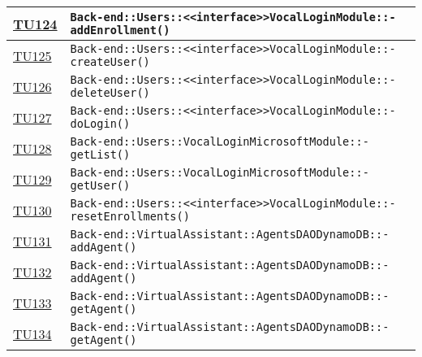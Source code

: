 \begin{longtable}{|>{\centering}m{1cm}|m{12cm}<{\centering}|}
\hyperlink{TU124}{TU124} & \texttt{Back-end::Users::<<interface>>VocalLoginModule::-\linebreak addEnrollment()}\\ \hline

\hyperlink{TU125}{TU125} & \texttt{Back-end::Users::<<interface>>VocalLoginModule::-\linebreak createUser()}\\ \hline

\hyperlink{TU126}{TU126} & \texttt{Back-end::Users::<<interface>>VocalLoginModule::-\linebreak deleteUser()}\\ \hline

\hyperlink{TU127}{TU127} & \texttt{Back-end::Users::<<interface>>VocalLoginModule::-\linebreak doLogin()}\\ \hline

\hyperlink{TU128}{TU128} & \texttt{Back-end::Users::VocalLoginMicrosoftModule::-\linebreak getList()}\\ \hline

\hyperlink{TU129}{TU129} & \texttt{Back-end::Users::VocalLoginMicrosoftModule::-\linebreak getUser()}\\ \hline

\hyperlink{TU130}{TU130} & \texttt{Back-end::Users::<<interface>>VocalLoginModule::-\linebreak resetEnrollments()}\\ \hline

\hyperlink{TU131}{TU131} & \texttt{Back-end::VirtualAssistant::AgentsDAODynamoDB::-\linebreak addAgent()}\\ \hline

\hyperlink{TU132}{TU132} & \texttt{Back-end::VirtualAssistant::AgentsDAODynamoDB::-\linebreak addAgent()}\\ \hline

\hyperlink{TU133}{TU133} & \texttt{Back-end::VirtualAssistant::AgentsDAODynamoDB::-\linebreak getAgent()}\\ \hline

\hyperlink{TU134}{TU134} & \texttt{Back-end::VirtualAssistant::AgentsDAODynamoDB::-\linebreak getAgent()}\\ \hline


\end{longtable}
